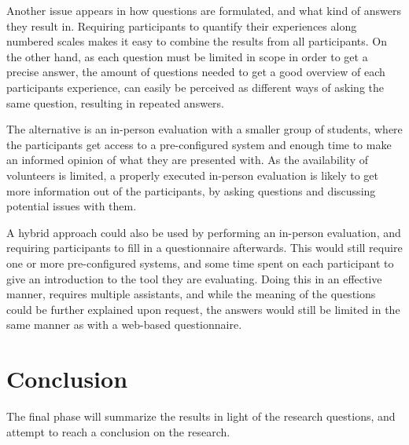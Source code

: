 Another issue appears in how questions are formulated, and what kind of answers they result in.
Requiring participants to quantify their experiences along numbered scales makes it easy to combine the results from all participants.
On the other hand, as each question must be limited in scope in order to get a precise answer, the amount of questions needed to get a good overview of each participants experience, can easily be perceived as different ways of asking the same question, resulting in repeated answers.

The alternative is an in-person evaluation with a smaller group of students, where the participants get access to a pre-configured system and enough time to make an informed opinion of what they are presented with.
As the availability of volunteers is limited, a properly executed in-person evaluation is likely to get more information out of the participants, by asking questions and discussing potential issues with them.

A hybrid approach could also be used by performing an in-person evaluation, and requiring participants to fill in a questionnaire afterwards.
This would still require one or more pre-configured systems, and some time spent on each participant to give an introduction to the tool they are evaluating.
Doing this in an effective manner, requires multiple assistants, and while the meaning of the questions could be further explained upon request, the answers would still be limited in the same manner as with a web-based questionnaire.

\section{Conclusion}\label{methConclude}

The final phase will summarize the results in light of the research questions, and attempt to reach a conclusion on the research.










